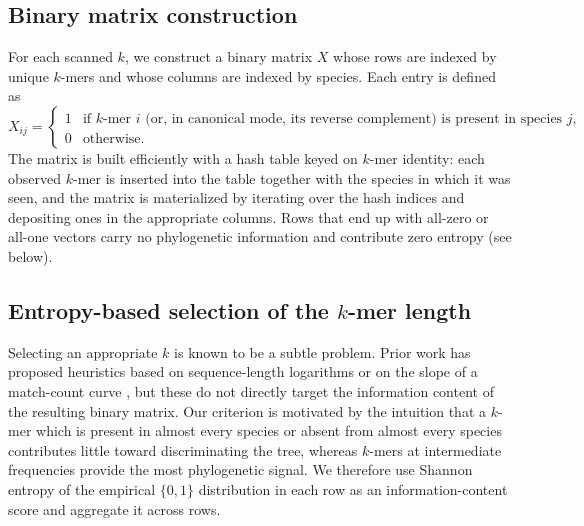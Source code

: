 \documentclass[11pt]{article}
\begin{document}
\subsection{Binary matrix construction}

For each scanned $k$, we construct a binary matrix $X$ whose rows are indexed
by unique $k$-mers and whose columns are indexed by species. Each entry is
defined as
\begin{equation*}
X_{ij} =
\begin{cases}
1 & \text{if $k$-mer $i$ (or, in canonical mode, its reverse complement) is present in species $j$,} \\
0 & \text{otherwise.}
\end{cases}
\end{equation*}
The matrix is built efficiently with a hash table keyed on $k$-mer identity:
each observed $k$-mer is inserted into the table together with the species in
which it was seen, and the matrix is materialized by iterating over the hash
indices and depositing ones in the appropriate columns. Rows that end up
with all-zero or all-one vectors carry no phylogenetic information and
contribute zero entropy (see below).

\subsection{Entropy-based selection of the $k$-mer length}

Selecting an appropriate $k$ is known to be a subtle problem. Prior work has
proposed heuristics based on sequence-length logarithms or on the slope of
a match-count curve \citep{rohling2020slopespam}, but these do not directly
target the information content of the resulting binary matrix. Our criterion
is motivated by the intuition that a $k$-mer which is present in almost every
species or absent from almost every species contributes little toward
discriminating the tree, whereas $k$-mers at intermediate frequencies provide
the most phylogenetic signal. We therefore use Shannon entropy
\citep{shannon1948mathematical} of the empirical $\{0, 1\}$ distribution in
each row as an information-content score and aggregate it across rows.
\end{document}

